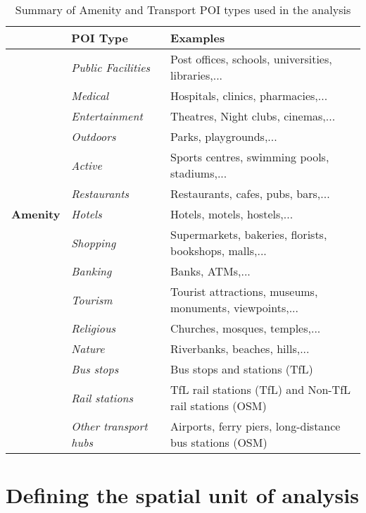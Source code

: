 \begin{table}[ht]
    \centering
    \renewcommand{\arraystretch}{1.1}
    \begin{tabular}{|l|l|l|}
        \hline
        \rowcolor{lightgray}
        & \textbf{POI Type} & \textbf{Examples} \\
        \hline
        \multirow{13}{*}{\textbf{Amenity}}
            &\textit{Public Facilities} & Post offices, schools, universities, libraries,... \\
            &\textit{Medical} & Hospitals, clinics, pharmacies,... \\
            &\textit{Entertainment} & Theatres, Night clubs, cinemas,... \\
            &\textit{Outdoors} & Parks, playgrounds,... \\
            &\textit{Active} & Sports centres, swimming pools, stadiums,... \\
            &\textit{Restaurants} & Restaurants, cafes, pubs, bars,... \\
            &\textit{Hotels} & Hotels, motels, hostels,... \\
            &\textit{Shopping} & Supermarkets, bakeries, florists, bookshops, malls,... \\
            &\textit{Banking} & Banks, ATMs,... \\
            &\textit{Tourism} & Tourist attractions, museums, monuments, viewpoints,... \\
            &\textit{Religious} & Churches, mosques, temples,... \\
            &\textit{Nature} & Riverbanks, beaches, hills,... \\
        \hline
        \multirow{3}{*}{\textbf{Transport}}
            &\textit{Bus stops} & Bus stops and stations (TfL) \\
            &\textit{Rail stations} & TfL rail stations (TfL) and Non-TfL rail stations (OSM) \\
            &\textit{Other transport hubs} & Airports, ferry piers, long-distance bus stations (OSM) \\
        \hline
    \end{tabular}
    \caption{Summary of Amenity and Transport POI types used in the analysis}
    \label{tab:osmpoi}
\end{table}


\pagebreak %
\section{Defining the spatial unit of analysis}

